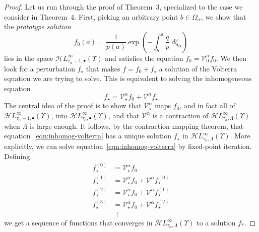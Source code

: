 \documentclass{article}
\newcommand{\singexp}[2]{\mathcal{H}L^\infty_{#1, #2}}
\newcommand{\singexpalg}[1]{\singexp{#1}{\bullet}}
\newcommand{\volterra}{\mathcal{V}}
\newcommand{\hardpart}{\mathcal{V}_0}
\newcommand{\softpart}{\mathcal{V}_\star}
\newcommand{\solwhole}{f}
\newcommand{\solproto}{f_0}
\newcommand{\solptb}{f_\star}
\theoremstyle{definition}
\theoremstyle{plain}
\begin{document}
\begin{proof}
Let us run through the proof of Theorem~3, specialized to the case we consider in Theorem~4. First, picking an arbitrary point $b \in \Omega_\alpha$, we show that the {\em prototype solution}
\[ \solproto(a) = \frac{1}{p(a)} \exp\left(-\int_{b}^{a}\frac{q}{p}\;d\zeta_\alpha\right) \]
lies in the space $\singexpalg{\tau_\alpha - 1}(\Upsilon)$ and satisfies the equation $\solproto = \hardpart^\alpha \solproto$. We then look for a perturbation $\solptb$ that makes $\solwhole = \solproto + \solptb$ a solution of the Volterra equation we are trying to solve. This is equivalent to solving the inhomogeneous equation
\begin{equation}\label{eqn:inhomog-volterra}
\solptb = \softpart^\alpha \solproto + \volterra^\alpha \solptb
\end{equation}
The central idea of the proof is to show that $\softpart^\alpha$ maps $\solproto$, and in fact all of $\singexpalg{\tau_\alpha - 1}(\Upsilon)$, into $\singexpalg{\tau_\alpha}(\Upsilon)$, and that $\volterra^\alpha$ is a contraction of $\singexp{\tau_\alpha}{\Lambda}(\Upsilon)$ when $\Lambda$ is large enough. It follows, by the contraction mapping theorem, that equation~\eqref{eqn:inhomog-volterra} has a unique solution $\solptb$ in $\singexp{\tau_\alpha}{\Lambda}(\Upsilon)$. More explicitly, we can solve equation~\eqref{eqn:inhomog-volterra} by fixed-point iteration. Defining
\begin{align*}
\solptb^{(0)} & = \softpart^\alpha \solproto \\
\solptb^{(1)} & = \softpart^\alpha \solproto + \volterra^\alpha \solptb^{(0)} \\
\solptb^{(2)} & = \softpart^\alpha \solproto + \volterra^\alpha \solptb^{(1)} \\
\solptb^{(3)} & = \softpart^\alpha \solproto + \volterra^\alpha \solptb^{(2)} \\
& \;\;\vdots
\end{align*}
we get a sequence of functions that converges in $\singexp{\tau_\alpha}{\Lambda}(\Upsilon)$ to a solution $f_*$.


\end{proof}
\end{document}
